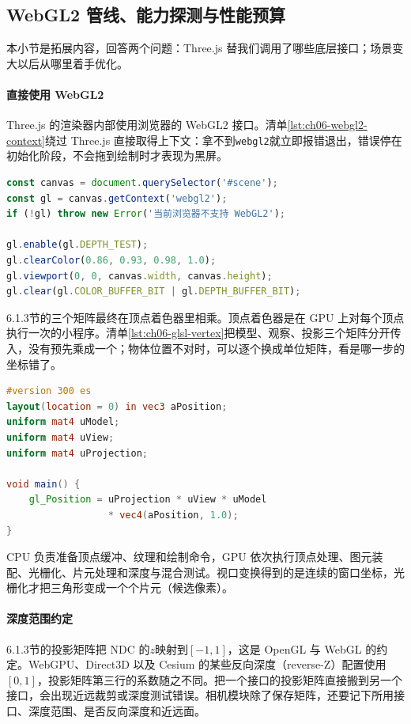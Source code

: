 \subsection{WebGL2 管线、能力探测与性能预算}

本小节是拓展内容，回答两个问题：Three.js 替我们调用了哪些底层接口；场景变大以后从哪里着手优化。

\paragraph{直接使用 WebGL2}Three.js 的渲染器内部使用浏览器的 WebGL2 接口。清单\ref{lst:ch06-webgl2-context}绕过 Three.js 直接取得上下文：拿不到\texttt{webgl2}就立即报错退出，错误停在初始化阶段，不会拖到绘制时才表现为黑屏。

\begin{lstlisting}[label={lst:ch06-webgl2-context},language=JavaScript,breaklines=true,caption={WebGL2 上下文初始化与能力检测}]
const canvas = document.querySelector('#scene');
const gl = canvas.getContext('webgl2');
if (!gl) throw new Error('当前浏览器不支持 WebGL2');

gl.enable(gl.DEPTH_TEST);
gl.clearColor(0.86, 0.93, 0.98, 1.0);
gl.viewport(0, 0, canvas.width, canvas.height);
gl.clear(gl.COLOR_BUFFER_BIT | gl.DEPTH_BUFFER_BIT);
\end{lstlisting}

6.1.3节的三个矩阵最终在顶点着色器里相乘。顶点着色器是在 GPU 上对每个顶点执行一次的小程序。清单\ref{lst:ch06-glsl-vertex}把模型、观察、投影三个矩阵分开传入，没有预先乘成一个；物体位置不对时，可以逐个换成单位矩阵，看是哪一步的坐标错了。

\begin{lstlisting}[label={lst:ch06-glsl-vertex},language=GLSL,caption={GLSL 顶点着色器：模型—视图—投影变换}]
#version 300 es
layout(location = 0) in vec3 aPosition;
uniform mat4 uModel;
uniform mat4 uView;
uniform mat4 uProjection;

void main() {
    gl_Position = uProjection * uView * uModel
                  * vec4(aPosition, 1.0);
}
\end{lstlisting}

CPU 负责准备顶点缓冲、纹理和绘制命令，GPU 依次执行顶点处理、图元装配、光栅化、片元处理和深度与混合测试。视口变换得到的是连续的窗口坐标，光栅化才把三角形变成一个个片元（候选像素）。

\paragraph{深度范围约定}6.1.3节的投影矩阵把 NDC 的$z$映射到$[-1,1]$，这是 OpenGL 与 WebGL 的约定。WebGPU、Direct3D 以及 Cesium 的某些反向深度（reverse-Z）配置使用$[0,1]$，投影矩阵第三行的系数随之不同。把一个接口的投影矩阵直接搬到另一个接口，会出现近远裁剪或深度测试错误。相机模块除了保存矩阵，还要记下所用接口、深度范围、是否反向深度和近远面。

